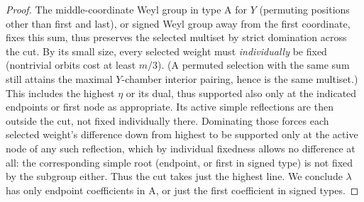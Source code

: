 \begin{proof}
The middle-coordinate Weyl group in type A for \(Y\) (permuting positions other than first and last), or signed Weyl group away from the first coordinate, fixes this sum, thus preserves the selected multiset by strict domination across the cut. By its small size, every selected weight must \emph{individually} be fixed (nontrivial orbits cost at least \(m/3\)). (A permuted selection with the same sum still attains the maximal \(Y\)-chamber interior pairing, hence is the same multiset.) This includes the highest \(\eta\) or its dual, thus supported also only at the indicated endpoints or first node as appropriate. Its active simple reflections are then outside the cut, not fixed individually there. Dominating those forces each selected weight's difference down from highest to be supported only at the active node of any such reflection, which by individual fixedness allows no difference at all: the corresponding simple root (endpoint, or first in signed type) is not fixed by the subgroup either. Thus the cut takes just the highest line. We conclude \(\lambda\) has only endpoint coefficients in A, or just the first coefficient in signed types.

\end{proof}

